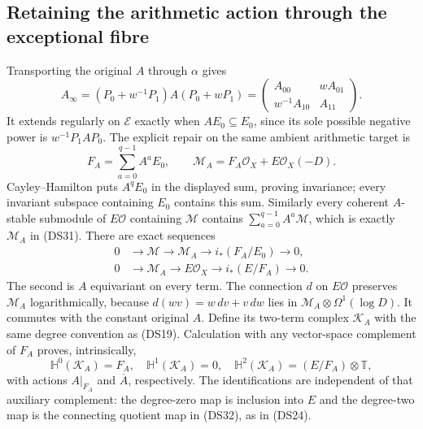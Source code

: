 \subsection{Retaining the arithmetic action through the exceptional fibre}

Transporting the original $A$ through $\alpha$ gives
\[
 \widehat A_\infty
 =(P_0+w^{-1}P_1)A(P_0+wP_1)
 =\begin{pmatrix}A_{00}&wA_{01}\\w^{-1}A_{10}&A_{11}\end{pmatrix}.
 \tag{DS30}
\]
It extends regularly on $\mathscr E$ exactly when $AE_0\subseteq E_0$,
since its sole possible negative power is $w^{-1}P_1AP_0$.
The explicit repair on the same ambient arithmetic target is
\[
 F_A=\sum_{a=0}^{q-1}A^aE_0,\qquad
 \mathcal M_A=F_A\mathcal O_X+E\mathcal O_X(-D).
 \tag{DS31}
\]
Cayley--Hamilton puts $A^qE_0$ in the displayed sum, proving
invariance; every invariant subspace containing $E_0$ contains this
sum.  Similarly every coherent $A$-stable submodule of $E\mathcal O$
containing $\mathcal M$ contains $\sum_{a=0}^{q-1}A^a\mathcal M$,
which is exactly $\mathcal M_A$ in (DS31).  There are exact sequences
\[
\begin{split}
0&\to\mathcal M\to\mathcal M_A\to i_*(F_A/E_0)\to0,\\
0&\to\mathcal M_A\to E\mathcal O_X\to i_*(E/F_A)\to0.
\end{split}\tag{DS32}
\]
The second is $A$ equivariant on every term.  The connection $d$ on
$E\mathcal O$ preserves $\mathcal M_A$ logarithmically, because
$d(wv)=w\,dv+v\,dw$ lies in
$\mathcal M_A\otimes\Omega^1(\log D)$.  It commutes with the
constant original $A$.  Define its two-term complex $\mathscr K_A$
with the same degree convention as (DS19).  Calculation with any
vector-space complement of $F_A$ proves, intrinsically,
\[
 \mathbb H^0(\mathscr K_A)=F_A,\quad
 \mathbb H^1(\mathscr K_A)=0,\quad
 \mathbb H^2(\mathscr K_A)=(E/F_A)\otimes\mathbb T,
 \tag{DS33}
\]
with actions $A|_{F_A}$ and $\overline A$, respectively.  The
identifications are independent of that auxiliary complement: the
degree-zero map is inclusion into $E$ and the degree-two map is the
connecting quotient map in (DS32), as in (DS24).

